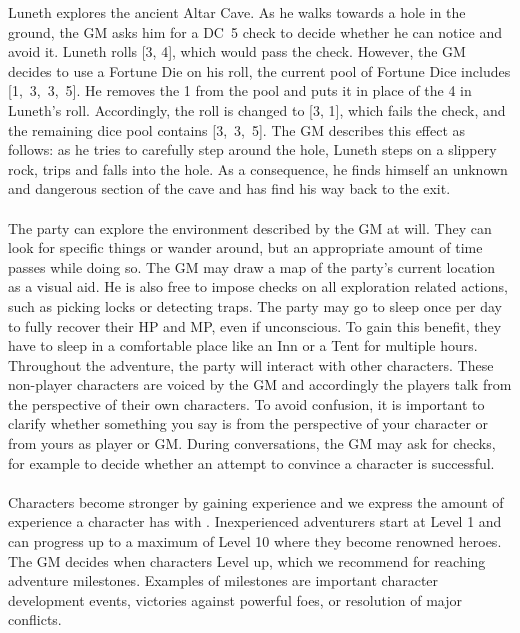 {
	Luneth explores the ancient Altar Cave. 
	As he walks towards a hole in the ground, the GM asks him for a DC~5 check to decide whether he can notice and avoid it.
	Luneth rolls [3, 4], which would pass the check.
	However, the GM decides to use a Fortune Die on his roll, the current pool of Fortune Dice includes \mbox{[1, 3, 3, 5]}.
	He removes the 1 from the pool and puts it in place of the 4 in Luneth's roll.  
	Accordingly, the roll is changed to [3, 1], which fails the check, and the remaining dice pool contains \mbox{[3, 3, 5]}.
	The GM describes this effect as follows: as he tries to carefully step around the hole, Luneth steps on a slippery rock, trips and falls into the hole.
	As a consequence, he finds himself an unknown and dangerous section of the cave and has find his way back to the exit.
}
%
\ofpar
%
\\\\
%
The party can explore the environment described by the GM at will.
They can look for specific things or wander around, but an appropriate amount of time passes while doing so.
The GM may draw a map of the party's current location as a visual aid. 
He is also free to impose checks on all exploration related actions, such as picking locks or detecting traps.
The party may go to sleep once per day to fully recover their HP and MP, even if unconscious.
To gain this benefit, they have to sleep in a comfortable place like an Inn or a Tent for multiple hours.
Throughout the adventure, the party will interact with other characters.
These non-player characters are voiced by the GM and accordingly the players talk from the perspective of their own characters.
To avoid confusion, it is important to clarify whether something you say is from the perspective of your character or from yours as player or GM.
During conversations, the GM may ask for checks, for example to decide whether an attempt to convince a character is successful.
%
\vfill
%
\\\\
%
Characters become stronger by gaining experience and we express the amount of experience a character has with .
Inexperienced adventurers start at Level 1 and can progress up to a maximum of Level 10 where they become renowned heroes. 
The GM decides when characters Level up, which we recommend for reaching adventure milestones.
Examples of milestones are important character development events, victories against powerful foes, or resolution of major conflicts. 
